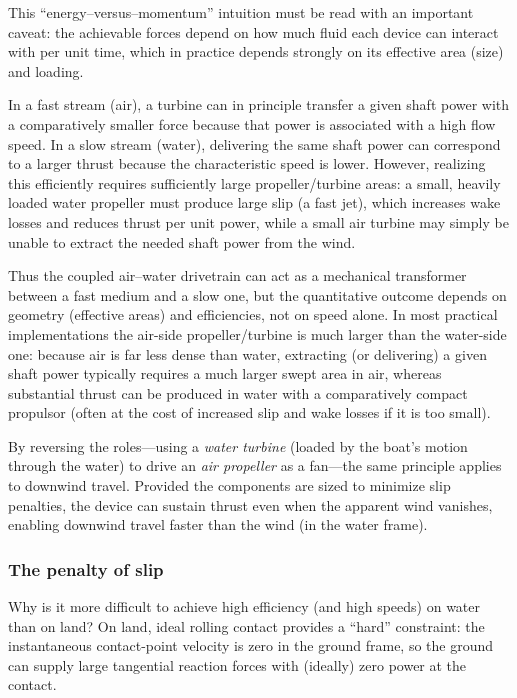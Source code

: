 \documentclass[reprint,aps,pra,longbibliography]{revtex4-2}
\begin{document}
This ``energy--versus--momentum'' intuition must be read
with an important caveat: the achievable forces depend on how much fluid each
device can interact with per unit time, which in practice depends strongly on
its effective area (size) and loading.

In a fast stream (air), a turbine can in principle transfer a given shaft power
with a comparatively smaller force because that power is associated with a high
flow speed.  In a slow stream (water), delivering the same shaft power can
correspond to a larger thrust because the characteristic speed is lower.
However, realizing this efficiently requires sufficiently large propeller/turbine
areas: a small, heavily loaded water propeller must produce large slip (a fast
jet), which increases wake losses and reduces thrust per unit power, while a
small air turbine may simply be unable to extract the needed shaft power from
the wind.

Thus the coupled air--water drivetrain can act as a mechanical transformer
between a fast medium and a slow one, but the quantitative outcome depends on
geometry (effective areas) and efficiencies, not on speed alone.  In most
practical implementations the air-side propeller/turbine is much larger than
the water-side one: because air is far less dense than water, extracting (or
delivering) a given shaft power typically requires a much larger swept area in
air, whereas substantial thrust can be produced in water with a comparatively
compact propulsor (often at the cost of increased slip and wake losses if it is
too small).

By reversing the roles---using a \emph{water turbine} (loaded by the boat's
motion through the water) to drive an \emph{air propeller} as a fan---the same
principle applies to downwind travel. Provided the components are sized to
minimize slip penalties, the device can sustain thrust even when the apparent
wind vanishes, enabling downwind travel faster than the wind (in the water
frame).

\subsubsection{The penalty of slip}

Why is it more difficult to achieve high efficiency (and high speeds) on water than on land?
On land, ideal rolling contact provides a ``hard'' constraint: the instantaneous
contact-point velocity is zero in the ground frame, so the ground can supply
large tangential reaction forces with (ideally) zero power at the contact.
\end{document}

